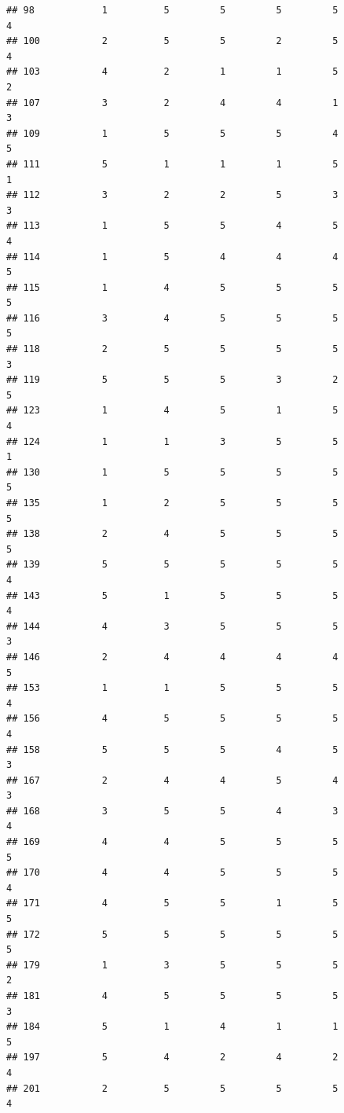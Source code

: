\documentclass[
]{article}
\begin{document}
\begin{verbatim}
## 98            1          5         5         5         5             4
## 100           2          5         5         2         5             4
## 103           4          2         1         1         5             2
## 107           3          2         4         4         1             3
## 109           1          5         5         5         4             5
## 111           5          1         1         1         5             1
## 112           3          2         2         5         3             3
## 113           1          5         5         4         5             4
## 114           1          5         4         4         4             5
## 115           1          4         5         5         5             5
## 116           3          4         5         5         5             5
## 118           2          5         5         5         5             3
## 119           5          5         5         3         2             5
## 123           1          4         5         1         5             4
## 124           1          1         3         5         5             1
## 130           1          5         5         5         5             5
## 135           1          2         5         5         5             5
## 138           2          4         5         5         5             5
## 139           5          5         5         5         5             4
## 143           5          1         5         5         5             4
## 144           4          3         5         5         5             3
## 146           2          4         4         4         4             5
## 153           1          1         5         5         5             4
## 156           4          5         5         5         5             4
## 158           5          5         5         4         5             3
## 167           2          4         4         5         4             3
## 168           3          5         5         4         3             4
## 169           4          4         5         5         5             5
## 170           4          4         5         5         5             4
## 171           4          5         5         1         5             5
## 172           5          5         5         5         5             5
## 179           1          3         5         5         5             2
## 181           4          5         5         5         5             3
## 184           5          1         4         1         1             5
## 197           5          4         2         4         2             4
## 201           2          5         5         5         5             4

\end{verbatim}
\end{document}
